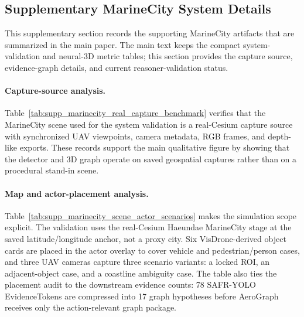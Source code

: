 \subsection{Supplementary MarineCity System Details}
\label{sec:supp_marinecity_system_details}

This supplementary section records the supporting MarineCity artifacts that are
summarized in the main paper. The main text keeps the compact system-validation and
neural-3D metric tables; this section provides the capture source,
evidence-graph details, and current reasoner-validation status.

\begin{table}[!htbp]
\centering
\scriptsize
\setlength{\tabcolsep}{4pt}
\caption{Verified real-Cesium MarineCity capture source for the current
multi-UAV 3D/reasoner handoff.}
\label{tab:supp_marinecity_real_capture_benchmark}

\end{table}

\paragraph{Capture-source analysis.}
Table~\ref{tab:supp_marinecity_real_capture_benchmark} verifies that the
MarineCity scene used for the system validation is a real-Cesium capture source
with synchronized UAV viewpoints, camera metadata, RGB frames, and depth-like
exports. These records support the main qualitative figure by showing that the
detector and 3D graph operate on saved geospatial captures rather than on a
procedural stand-in scene.

\begin{table}[!htbp]
\centering
\scriptsize
\setlength{\tabcolsep}{4pt}
\caption{MarineCity map, actor placement, and scenario audit used by the
current 3D/reasoner validation. The Cesium georeference height is the scene
anchor readback; the UAV capture altitude is reported separately because it is
the camera operating band used for the detector and 3D handoff.}
\label{tab:supp_marinecity_scene_actor_scenarios}
\resizebox{\textwidth}{!}{%

}
\end{table}

\paragraph{Map and actor-placement analysis.}
Table~\ref{tab:supp_marinecity_scene_actor_scenarios} makes the simulation
scope explicit. The validation uses the real-Cesium Haeundae MarineCity stage
at the saved latitude/longitude anchor, not a proxy city. Six VisDrone-derived
object cards are placed in the actor overlay to cover vehicle and
pedestrian/person cases, and three UAV cameras capture three scenario variants:
a locked ROI, an adjacent-object case, and a coastline ambiguity case. The
table also ties the placement audit to the downstream evidence counts: 78
SAFR-YOLO EvidenceTokens are compressed into 17 graph hypotheses before
AeroGraph receives only the action-relevant graph package.

